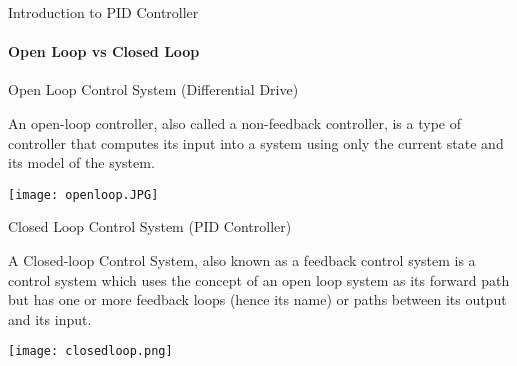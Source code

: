 \documentclass{beamer}
\begin{document}
  \begin{frame}[allowframebreaks]{Introduction to PID Controller}
  	\framesubtitle{Open Loop vs Closed Loop}
  	
  	\begin{alertblock}{Open Loop Control System (Differential Drive)}
  	
  	An open-loop controller, also called a non-feedback controller, is a type of controller that computes its input into a system using only the current state and its model of the system.
  	\bigskip
  	
  	\texttt{[image: openloop.JPG]}
  	
  	
  	\end{alertblock}

		\bigskip
  	
  	\begin{alertblock}{Closed Loop Control System (PID Controller)}
  	
  	A Closed-loop Control System, also known as a feedback control system is a control system which uses the concept of an open loop system as its forward path but has one or more feedback loops (hence its name) or paths between its output and its input.
  	
  	\bigskip
  	
  	\texttt{[image: closedloop.png]}
  	
  	\end{alertblock}
  	
  	
  	

  \end{frame}
  
\end{document}
